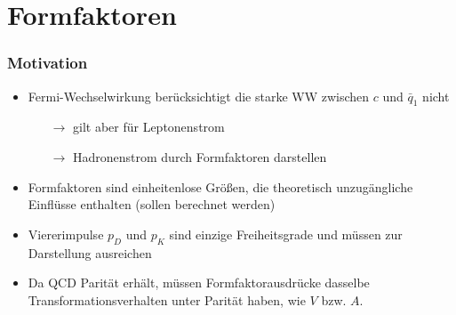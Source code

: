 \documentclass[hyperref={pdfpagelabels=false}]{beamer}
\begin{document}
\section{Formfaktoren}
\begin{frame}
\tableofcontents[currentsection]
\end{frame}
\begin{frame}
 \frametitle{Motivation}
 \begin{itemize}
  \item Fermi-Wechselwirkung berücksichtigt die starke WW zwischen $c$ und $\bar q_1$ nicht
  \begin{itemize}
   \item [$\rightarrow$] gilt aber für Leptonenstrom
   \item [$\rightarrow$] Hadronenstrom durch Formfaktoren darstellen
  \end{itemize}
  \item Formfaktoren sind einheitenlose Größen, die theoretisch unzugängliche Einflüsse enthalten (sollen berechnet werden)
  \item Viererimpulse $p_D$ und $p_K$ sind einzige Freiheitsgrade und müssen zur Darstellung ausreichen
  \item Da QCD Parität erhält, müssen Formfaktorausdrücke dasselbe Transformationsverhalten unter Parität haben, wie $V$ bzw. $A$.
 \end{itemize}
\end{frame}
\end{document}
